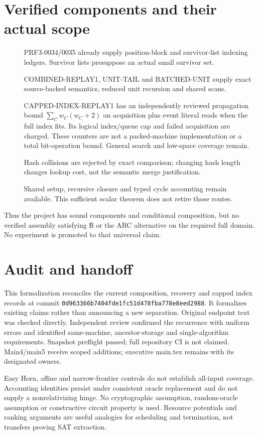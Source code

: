 \documentclass[11pt]{article}
\begin{document}
\section{Verified components and their actual scope}
\begin{description}
\item[] PRF3-0034/0035 already supply position-block and survivor-list
indexing ledgers. Survivor lists presuppose an actual small survivor set.
\item[] COMBINED-REPLAY1, UNIT-TAIL and BATCHED-UNIT supply exact
source-backed semantics, reduced unit recursion and shared scans.
\item[] CAPPED-INDEX-REPLAY1 has an independently reviewed propagation
bound $\sum_C w_C(w_C+2)$ on acquisition plus event literal reads when
the full index fits. Its logical index/queue cap and failed acquisition
are charged. These counters are not a packed-machine implementation or
a total bit-operation bound. General search and low-space coverage remain.
\item[] Hash collisions are rejected by exact comparison; changing hash
length changes lookup cost, not the semantic merge justification.
\item[] Shared setup, recursive closure and typed cycle accounting remain
available. This sufficient scalar theorem does not retire those routes.
\end{description}
Thus the project has sound components and conditional composition, but
no verified assembly satisfying $\mathsf B$ or the ARC alternative on
the required full domain. No experiment is promoted to that universal claim.

\section{Audit and handoff}
This formalization reconciles the current composition, recovery and capped
index records at commit
\texttt{0d963366b7404fde1fc51d478fba778e8eed2988}. It formalizes existing
claims rather than announcing a new separation. Original endpoint text
was checked directly. Independent review confirmed the recurrence with
uniform errors and identified same-machine, ancestor-storage and
single-algorithm requirements. Snapshot preflight passed; full repository
CI is not claimed. Main4/main5 receive scoped additions; executive
main.tex remains with its designated owners.

Easy Horn, affine and narrow-frontier controls do not establish all-input
coverage. Accounting identities persist under consistent oracle
replacement and do not supply a nonrelativizing hinge. No cryptographic
assumption, random-oracle assumption or constructive circuit property is
used. Resource potentials and ranking arguments are useful analogies for
scheduling and termination, not transfers proving SAT extraction.
\end{document}
